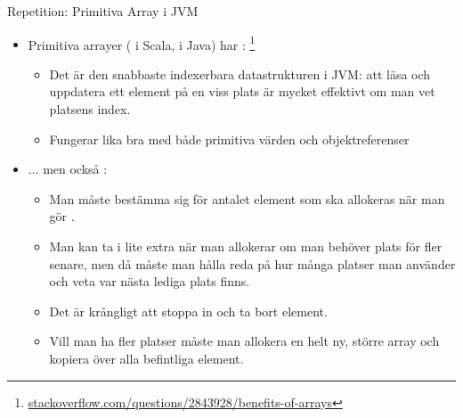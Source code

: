 \begin{Slide}{Repetition: Primitiva Array i JVM}
\begin{itemize}
\item Primitiva arrayer ( i Scala, \code{[]} i Java) har :%
\footnote{\href{http://stackoverflow.com/questions/2843928/benefits-of-arrays}{stackoverflow.com/questions/2843928/benefits-of-arrays}} 
\begin{itemize}\footnotesize
\item Det är den snabbaste indexerbara datastrukturen i JVM: att läsa och uppdatera ett element på en viss plats är mycket effektivt om man vet platsens index. 
\item Fungerar lika bra med både primitiva värden och objektreferenser
\end{itemize}
\item ... men också :
\begin{itemize}\footnotesize
\item Man måste bestämma sig för antalet element som ska allokeras när man gör . 
\item Man kan ta i lite extra när man allokerar om man behöver plats för fler senare, men då måste man hålla reda på hur många platser man använder och veta var nästa lediga plats finns.
\item Det är krångligt att stoppa in  och ta bort  element.
\item Vill man ha fler platser måste man allokera en helt ny, större array och kopiera över alla befintliga element.
\end{itemize}

\end{itemize}
\end{Slide}




